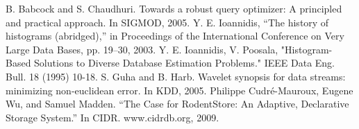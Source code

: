 \documentclass[10pt, conference, compsocconf]{IEEEtran}
\begin{document}
\begin{thebibliography}{1}
B. Babcock and S. Chaudhuri. Towards a robust query optimizer: A principled and practical approach. In SIGMOD, 2005.
Y. E. Ioannidis, “The history of histograms (abridged),” in Proceedings of the International Conference on Very Large Data Bases, pp. 19–30, 2003.
Y. E. Ioannidis, V. Poosala, "Histogram-Based Solutions to
Diverse Database Estimation Problems." IEEE Data Eng. Bull. 18 (1995) 10-18.
S. Guha and B. Harb. Wavelet synopsis for data streams: minimizing non-euclidean error. In KDD, 2005.
Philippe Cudré-Mauroux, Eugene Wu, and Samuel Madden. “The Case for RodentStore: An Adaptive, Declarative Storage System.” In CIDR. www.cidrdb.org, 2009.
\end{thebibliography}
\end{document}
